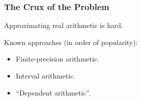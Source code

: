 \begin{frame}

\frametitle{The Crux of the Problem}

\vspace{\fill}

\begin{center}

Approximating real arithmetic is hard.

\end{center}

\vspace{\fill}

Known approaches (in order of popularity):

\begin{itemize}

\item Finite-precision arithmetic.

\item Interval arithmetic.

\item ``Dependent arithmetic''.

\end{itemize}

\end{frame}
